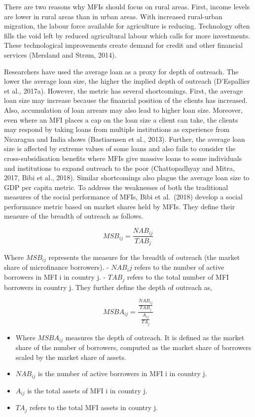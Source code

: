 \documentclass[a4paper, nobind]{templates/ociamthesis}
\begin{document}
There are two reasons why MFIs should focus on rural areas. First, income levels are lower in rural areas than in urban areas. With increased rural-urban migration, the labour force available for agriculture is reducing. Technology often fills the void left by reduced agricultural labour which calls for more investments. These technological improvements create demand for credit and other financial services (Mersland and Strøm, 2014).

Researchers have used the average loan as a proxy for depth of outreach. The lower the average loan size, the higher the implied depth of outreach (D'Espallier et al., 2017a). However, the metric has several shortcomings. First, the average loan size may increase because the financial position of the clients has increased. Also, accumulation of loan arrears may also lead to higher loan size. Moreover, even where an MFI places a cap on the loan size a client can take, the clients may respond by taking loans from multiple institutions as experience from Nicaragua and India shows (Bastiaensen et al., 2013). Further, the average loan size is affected by extreme values of some loans and also fails to consider the cross-subsidisation benefits where MFIs give massive loans to some individuals and institutions to expand outreach to the poor (Chattopadhyay and Mitra, 2017, Bibi et al., 2018). Similar shortcomings also plague the average loan size to GDP per capita metric. To address the weaknesses of both the traditional measures of the social performance of MFIs, Bibi et al.~(2018) develop a social performance metric based on market shares held by MFIs. They define their measure of the breadth of outreach as follows.

\begin{equation}
MSB_{ij} = \frac{NAB_{ij}}{TAB_j}
\end{equation}

Where \(MSB_{ij}\) represents the measure for the breadth of outreach (the market share of microfinance borrowers).
- \(NAB_ij\) refers to the number of active borrowers in MFI i in country j.
- \(TAB_j\) refers to the total number of MFI borrowers in country j.
They further define the depth of outreach as,

\begin{equation}
MSBA_{ij} = \frac{\frac{NAB_{ij}}{TAB_{j}}}{\frac{A_{ij}}{TA_j}}
\end{equation}

\begin{itemize}
\item
  Where \(MSBA_{ij}\) measures the depth of outreach. It is defined as the market share of the number of borrowers, computed as the market share of borrowers scaled by the market share of assets.
\item
  \(NAB_{ij}\) is the number of active borrowers in MFI i in country j.
\item
  \(A_{ij}\) is the total assets of MFI i in country j.
\item
  \(TA_j\) refers to the total MFI assets in country j.
\end{itemize}
\end{document}
